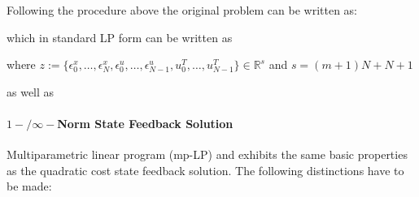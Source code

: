 \documentclass[8pt,a4paper]{scrartcl}
\begin{document}
\begin{multicols*}{3}
Following the procedure above the original problem can be written as:

\small
{}
\normalsize

which in standard LP form can be written as


where $z:=\{\epsilon_0^x,\ldots,\epsilon_N^x,\epsilon_0^u,\ldots,\epsilon_{N-1}^u,u_0^T,\ldots,u_{N-1}^T\}\in\mathbb{R}^s$ and $s=(m+1)N+N+1$

as well as


\paragraph{$1-/\infty-$Norm State Feedback Solution} Multiparametric linear program (mp-LP) and exhibits the same basic properties as the quadratic cost state feedback solution. The following distinctions have to be made:


\end{multicols*}
\end{document}
